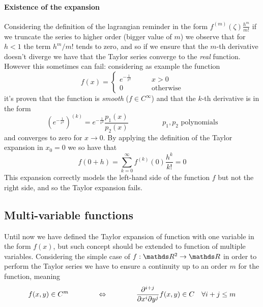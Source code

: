 	\paragraph{Existence of the expansion} Considering the definition of the lagrangian reminder in the form $f^{(m)}(\zeta) \frac{h^m}{m!}$ if we truncate the series to higher order (bigger value of $m$) we observe that for $h <1$ the term $h^m/m!$ tends to zero, and so if we ensure that the $m$-th derivative doesn't diverge we have that the Taylor series converge to the \textit{real} function. However this sometimes can fail: considering as example the function
	\[ f(x) = \begin{cases}
		e^{-\frac 1 {x^2}} \qquad & x> 0 \\ 0 & \textrm{otherwise}
	\end{cases} \]
	it's proven that the function is \textit{smooth} ($f\in C^\infty$) and that the $k$-th derivative is in the form
	\[ \left(e^{-\frac 1 {x^2}}\right)^{(k)} = e^{-\frac 1 {x^2}} \frac{p_1(x)}{p_2(x)} \hspace{2cm} p_1,p_2 \textrm{ polynomials} \]
	and converges to zero for $x\rightarrow 0$. By applying the definition of the Taylor expansion in $x_0=0$ we so have that
	\[ f(0+h) = \sum_{k=0}^\infty f^{(k)}(0) \frac{h^k}{k!} = 0 \]
	This expansion correctly models the left-hand side of the function $f$ but not the right side, and so the Taylor expansion fails.
	
\subsection{Multi-variable functions}
	Until now we have defined the Taylor expansion of function with one variable in the form $f(x)$, but such concept should be extended to function of multiple variables. Considering the simple case of $f:\R^2\rightarrow \R$ in order to perform the Taylor series we have to ensure a continuity up to an order $m$ for the function, meaning 
	\begin{equation}
		f(x,y) \in C^m \hspace{1.4cm} \Leftrightarrow \hspace{1.4cm} \frac{\partial^{i+j}}{\partial x^i \partial y^j} f(x,y) \in C \quad \forall i+j \leq m
	\end{equation}
	
